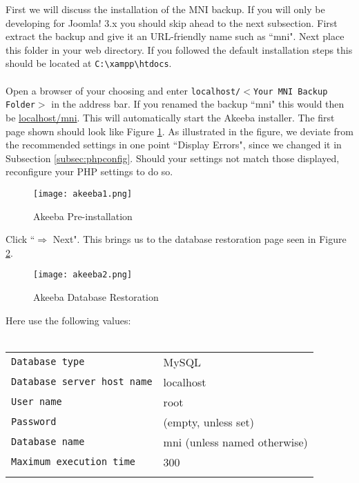 First we will discuss the installation of the MNI backup. If you will only be developing for Joomla! 3.x you should skip ahead to the next subsection. First extract the backup and give it an URL-friendly name such as ``mni". Next place this folder in your web directory. If you followed the default installation steps this should be located at \texttt{C:\textbackslash xampp\textbackslash htdocs}.\\
\\
Open a browser of your choosing and enter \texttt{localhost/$<$Your MNI Backup Folder$>$} in the address bar. If you renamed the backup ``mni" this would then be \url{localhost/mni}. This will automatically start the Akeeba installer. The first page shown should look like Figure \ref{fig:akeebapreinstallation}. As illustrated in the figure, we deviate from the recommended settings in one point ``Display Errors", since we changed it in Subsection \ref{subsec:phpconfig}. Should your settings not match those displayed, reconfigure your PHP settings to do so.\\

\begin{figure}[h] 
	\centering
	\texttt{[image: akeeba1.png]}
	\caption{Akeeba Pre-installation}
	\label{fig:akeebapreinstallation}
\end{figure}

\noindent
Click ``$\Rightarrow$ Next". This brings us to the database restoration page seen in Figure \ref{fig:akeebadatabaserestoration}.

\newpage

\begin{figure}[h] 
	\centering
	\texttt{[image: akeeba2.png]}
	\caption{Akeeba Database Restoration}
	\label{fig:akeebadatabaserestoration}
\end{figure}

\noindent
Here use the following values:\\
\\
\begin{tabular}{l l}
	\texttt{Database type} & MySQL\\
	\texttt{Database server host name} & localhost\\
	\texttt{User name} & root\\
	\texttt{Password} & (empty, unless set)\\
	\texttt{Database name} & mni (unless named otherwise)\\
	\texttt{Maximum execution time} & 300\\\\
\end{tabular}

